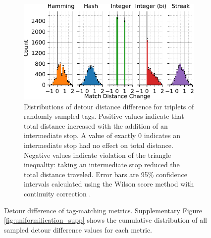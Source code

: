 \begin{figure}[!htbp]
\begin{center}
\begin{minipage}{\linewidth}
\begin{subfigure}[b]{\linewidth}
\includegraphics[width=\linewidth]{img/detour_difference/bitweight=0dot5+seed=1+title=low-triplet-analysis+viz=hist+_data_hathash_hash=6b0749ef97a58721+_script_fullcat_hash=866294f0a66ef153+ext=}
\caption{
Distributions of detour distance difference for triplets of randomly sampled tags.
Positive values indicate that total distance increased with the addition of an intermediate stop.
A value of exactly 0 indicates an intermediate stop had no effect on total distance.
Negative values indicate violation of the triangle inequality: taking an intermediate stop reduced the total distance traveled.
Error bars are 95\% confidence intervals calculated using the Wilson score method with continuity correction \citep{newcombe1998two}.
} \label{fig:detour_difference_distribution}

\end{subfigure}
\end{minipage}

\caption{
Detour difference of tag-matching metrics.
Supplementary Figure \ref{fig:uniformification_supp} shows the cumulative distribution of all sampled detour difference values for each metric.
}
\label{fig:detour_difference}

\end{center}
\end{figure}
